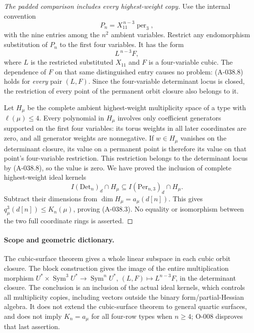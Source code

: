 \begin{proof}[The padded comparison includes every highest-weight copy]
Use the internal convention
\[
              P_n=X_{11}^{\,n-3}\operatorname{per}_3,
\]
with the nine entries among the \(n^2\) ambient variables.
Restrict any endomorphism substitution of \(P_n\) to the
first four variables. It has the form
\[
                          L^{\,n-3}F,
\]
where \(L\) is the restricted substituted \(X_{11}\) and
\(F\) is a four-variable cubic. The dependence of \(F\)
on that same distinguished entry causes no problem:
(A-038.8) holds for \emph{every} pair \((L,F)\).
Since the four-variable determinant locus is closed, the
restriction of every point of the permanent orbit closure
also belongs to it.

Let \(H_\mu\) be the complete ambient highest-weight
multiplicity space of a type with \(\ell(\mu)\leq4\).
Every polynomial in \(H_\mu\) involves only coefficient
generators supported on the first four variables: its
torus weights in all later coordinates are zero, and all
generator weights are nonnegative.
If \(w\in H_\mu\) vanishes on the determinant closure,
its value on a permanent point is therefore its value
on that point's four-variable restriction. This restriction
belongs to the determinant locus by (A-038.8), so the
value is zero. We have proved the inclusion of complete
highest-weight ideal kernels
\[
       I(\mathrm{Det}_n)_d\cap H_\mu
                    \subseteq I(\mathrm{Per}_{n,3})_d\cap H_\mu.
                                                               \tag{A-038.10}
\]
Subtract their dimensions from \(\dim H_\mu=a_\mu(d[n])\).
This gives \(q^3_\mu(d[n])\leq K_n(\mu)\), proving
(A-038.3). No equality or isomorphism between the two
full coordinate rings is asserted.
\end{proof}

\paragraph{Scope and geometric dictionary.}
The cubic-surface theorem gives a whole linear subspace in
each cubic orbit closure. The block construction gives the
image of the entire multiplication morphism
\(U^*\times\operatorname{Sym}^3U^*\to\operatorname{Sym}^nU^*\),
\((L,F)\mapsto L^{n-3}F\), in the determinant closure.
The conclusion is an inclusion of the actual ideal kernels,
which controls all multiplicity copies, including vectors
outside the binary form/partial-Hessian algebra.
It does not extend the cubic-surface theorem to general
quartic surfaces, and does not imply \(K_n=a_\mu\) for
all four-row types when \(n\geq4\); O-008 disproves that
last assertion.

